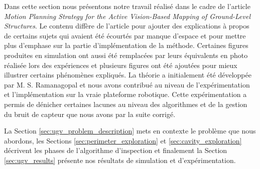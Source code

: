 ﻿%
\label{sec:ugv}

Dans cette section nous présentons notre travail réalisé dans le cadre de l'article \textit{Motion Planning Strategy for the Active Vision-Based Mapping of Ground-Level Structures}. Le contenu diffère de l'article pour ajouter des explications à propos de certains sujets qui avaient été écourtés par manque d'espace et pour mettre plus d'emphase sur la partie d'implémentation de la méthode. Certaines figures produites en simulation ont aussi été remplacées par leurs équivalents en photo réalisée lors des expériences et plusieurs figures ont été ajoutées pour mieux illustrer certains phénomènes expliqués. La théorie a initialement été développée par M. S. Ramanagopal et nous avons contribué au niveau de l'expérimentation et l'implémentation sur la vraie plateforme robotique. Cette expérimentation a permis de dénicher certaines lacunes au niveau des algorithmes et de la gestion du bruit de capteur que nous avons par la suite corrigé.

La Section \ref{sec:ugv_problem_description} mets en contexte le problème que nous abordons, les Sections \ref{sec:perimeter_exploration} et \ref{sec:cavity_exploration} décrivent les phases de l'algorithme d'inspection et finalement la Section \ref{sec:ugv_results} présente nos résultats de simulation et d'expérimentation.

